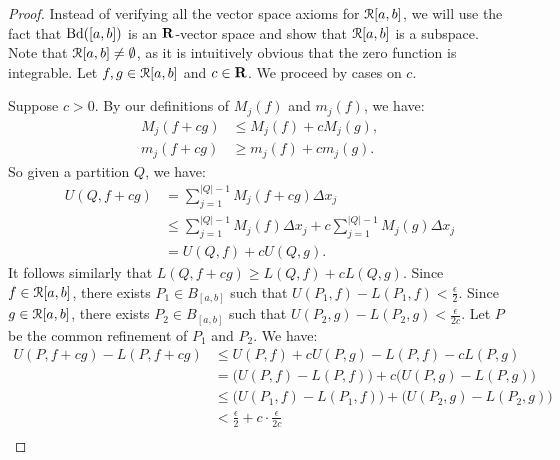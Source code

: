 \documentclass[11pt,twoside,openany]{memoir}
\begin{document}
        \begin{proof}
            Instead of verifying all the vector space axioms for $\mathcal{R}[a,b]$, we will use the fact that $\operatorname{Bd}([a,b])$ is an $\mathbf{R}$-vector space and show that $\mathcal{R}[a,b]$ is a subspace. Note that $\mathcal{R}[a,b] \neq \emptyset$, as it is intuitively obvious that the zero function is integrable. Let $f,g \in \mathcal{R}[a,b]$ and $c \in \mathbf{R}$. We proceed by cases on $c$.
            
            Suppose $c > 0$. By our definitions of $M_j(f)$ and $m_j(f)$, we have:
                \begin{equation*}
                \begin{split}
                    M_j(f+cg) &\leq M_j(f) + cM_j(g), \\
                    m_j(f+cg) &\geq m_j(f) + cm_j(g).
                \end{split}
                \end{equation*}
            So given a partition $Q$, we have:
                \begin{equation*}
                \begin{split}
                    U(Q,f+cg)
                    & = \sum_{j = 1}^{|Q|-1}M_j(f+cg)\Delta x_j \\
                    & \leq \sum_{j = 1}^{|Q|-1}M_j(f)\Delta x_j+c\sum_{j = 1}^{|Q|-1}M_j(g)\Delta x_j \\
                    & = U(Q,f) + cU(Q,g).
                \end{split}
                \end{equation*}
            It follows similarly that $L(Q,f+cg) \geq L(Q,f) + cL(Q,g)$. Since $f \in \mathcal{R}[a,b]$, there exists $P_1 \in B_{[a,b]}$ such that $U(P_1,f) - L(P_1,f) < \frac{\epsilon}{2}$. Since $g \in \mathcal{R}[a,b]$, there exists $P_2 \in B_{[a,b]}$ such that $U(P_2,g) - L(P_2,g) < \frac{\epsilon}{2c}$. Let $P$ be the common refinement of $P_1$ and $P_2$. We have:
                \begin{equation*}
                \begin{split}
                    U(P,f+cg) - L(P,f+cg) 
                    & \leq U(P,f) + cU(P,g) - L(P,f) - cL(P,g) \\
                    & = \bigl(U(P,f) - L(P,f)\bigr) + c \bigl(U(P,g) - L(P,g)\bigr) \\
                    & \leq \bigl(U(P_1,f) - L(P_1,f)\bigr) + \bigl(U(P_2,g) - L(P_2,g)\bigr) \\
                    & < \frac{\epsilon}{2} + c\cdot\frac{\epsilon}{2c} \\

\end{split}
\end{equation*}
\end{proof}
\end{document}
